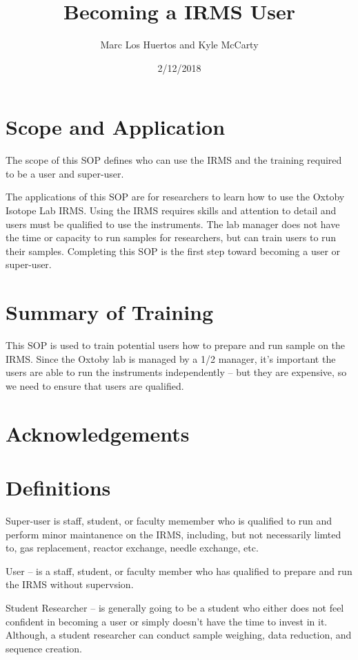 \documentclass[12pt]{../SOP3_beta}\usepackage[]{graphicx}\usepackage[]{color}
\title{Becoming a IRMS User}
\date{2/12/2018}
\author{Marc Los Huertos and Kyle McCarty}
\begin{document}
\maketitle

\section{Scope and Application}

\NP The scope of this SOP defines who can use the IRMS and the training required to be a user and super-user.

\NP The applications of this SOP are for researchers to learn how to use the Oxtoby Isotope Lab IRMS. Using the IRMS requires skills and attention to detail and users must be qualified to use the instruments. The lab manager does not have the time or capacity to run samples for researchers, but can train users to run their samples. Completing this SOP is the first step toward becoming a user or super-user.

\section{Summary of Training}

\NP This SOP is used to train potential users how to prepare and run sample on the IRMS. Since the Oxtoby lab is managed by a 1/2 manager, it's important the users are able to run the instruments independently -- but they are expensive, so we need to ensure that users are qualified.

\tableofcontents

\newpage

\section{Acknowledgements}

\section{Definitions}

\NP Super-user is staff, student, or faculty memember who is qualified to run and perform minor maintanence on the IRMS, including, but not necessarily limted to, gas replacement, reactor exchange, needle exchange, etc.  

\NP User -- is a staff, student, or faculty member who has qualified to prepare and run the IRMS without supervsion.

\NP Student Researcher -- is generally going to be a student who either does not feel confident in becoming a user or simply doesn't have the time to invest in it. Although, a student researcher can conduct sample weighing, data reduction, and sequence creation.
\end{document}
